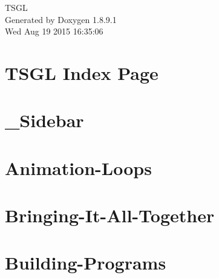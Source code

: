 \documentclass[twoside]{book}
\newcommand{\+}{\discretionary{\mbox{\scriptsize$\hookleftarrow$}}{}{}}
\newcommand{\clearemptydoublepage}{%
  \newpage{\pagestyle{empty}\cleardoublepage}%
}
\begin{document}
\hypersetup{pageanchor=false,
             bookmarks=true,
             bookmarksnumbered=true,
             pdfencoding=unicode
            }
\begin{titlepage}
\vspace*{7cm}
\begin{center}%
{\Large T\+S\+G\+L }\\
\vspace*{1cm}
{\large Generated by Doxygen 1.8.9.1}\\
\vspace*{0.5cm}
{\small Wed Aug 19 2015 16:35:06}\\
\end{center}
\end{titlepage}
\clearemptydoublepage
\tableofcontents
\clearemptydoublepage
{}
\hypersetup{pageanchor=true}

\chapter{T\+S\+G\+L Index Page}
\label{index}\hypertarget{index}{}
\chapter{\+\_\+\+Sidebar}
\label{md__home_pretzel_workspace_tsgl__t_s_g_l_docs-wiki___sidebar}
\hypertarget{md__home_pretzel_workspace_tsgl__t_s_g_l_docs-wiki___sidebar}{}

\chapter{Animation-\/\+Loops}
\label{md__home_pretzel_workspace_tsgl__t_s_g_l_docs-wiki__animation-_loops}
\hypertarget{md__home_pretzel_workspace_tsgl__t_s_g_l_docs-wiki__animation-_loops}{}

\chapter{Bringing-\/\+It-\/\+All-\/\+Together}
\label{md__home_pretzel_workspace_tsgl__t_s_g_l_docs-wiki__bringing-_it-_all-_together}
\hypertarget{md__home_pretzel_workspace_tsgl__t_s_g_l_docs-wiki__bringing-_it-_all-_together}{}

\chapter{Building-\/\+Programs}
\label{md__home_pretzel_workspace_tsgl__t_s_g_l_docs-wiki__building-_programs}
\hypertarget{md__home_pretzel_workspace_tsgl__t_s_g_l_docs-wiki__building-_programs}{}

\end{document}
